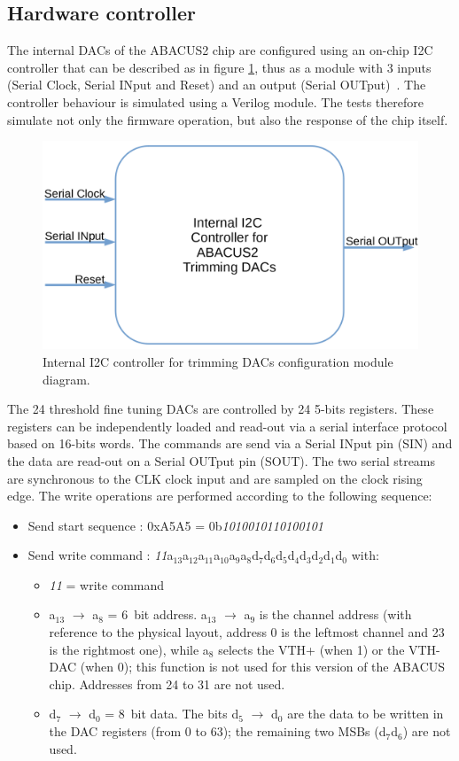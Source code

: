 \subsection{Hardware controller}\label{InternalDac}
\noindent The internal DACs of the ABACUS2 chip are configured using an on-chip I2C controller that can be described as in figure \ref{fig:internaldac}, thus as a module with 3 inputs (Serial Clock, Serial INput and Reset) and an output (Serial OUTput)~\cite{dac}.
The controller behaviour is simulated using a Verilog module.
The tests therefore simulate not only the firmware operation, but also the response of the chip itself.
\begin{figure}[H]
	\centering
	\includegraphics[width=0.34\linewidth]{IMG/ch4/INTERNALDAC.PNG}
	\caption{Internal I2C controller for trimming DACs configuration module diagram.}
	\label{fig:internaldac}
\end{figure}
\noindent The 24 threshold fine tuning DACs are controlled by 24 5-bits registers. These registers can be independently
loaded and read-out via a serial interface protocol based on 16-bits words. The commands are send via a Serial
INput pin (SIN) and the data are read-out on a Serial OUTput pin (SOUT). The two serial streams are
synchronous to the CLK clock input and are sampled on the clock rising edge.
The write operations are performed according to the following sequence:
\begin{itemize}
	\item Send start sequence : 0xA5A5 = 0b\textit{1010010110100101}
	\item Send write command : \textit{11}a$_{13}$a$_{12}$a$_{11}$a$_{10}$a$_{9}$a$_{8}$d$_{7}$d$_{6}$d$_{5}$d$_{4}$d$_{3}$d$_{2}$d$_{1}$d$_{0}$ with:
	\begin{itemize}
		\item \textit{11} = write command
		\item a$_{13}$ $\rightarrow$ a$_{8}$ = 6~bit address. a$_{13}$ $\rightarrow$ a$_{9}$ is the channel address (with reference to the physical layout, address 0 is the leftmost channel and 23 is the rightmost one), while a$_{8}$ selects the VTH+ (when 1) or the VTH- DAC (when 0); this function is not used for this version of the ABACUS chip. Addresses from 24 to 31 are not used.
		\item d$_{7}$ $\rightarrow$ d$_{0}$ = 8~bit data. The bits d$_{5}$ $\rightarrow$ d$_{0}$ are the data to be written in the DAC registers (from 0 to 63); the remaining two MSBs (d$_{7}$d$_{6}$) are not used.
	\end{itemize}
\end{itemize}
